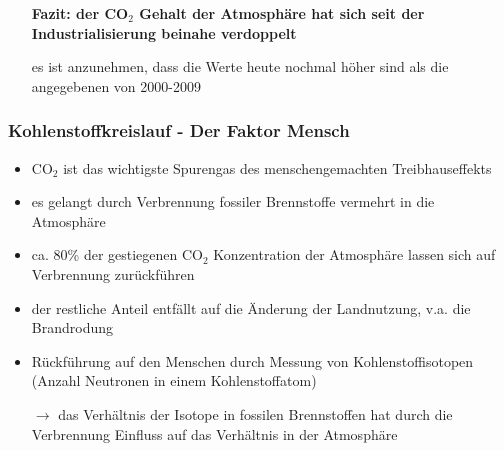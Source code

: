 \begin{frame}
{\begin{itemize}
			\item[] \textbf{Fazit: der CO$_2$ Gehalt der Atmosphäre hat sich seit der Industrialisierung beinahe verdoppelt}
			\item[] es ist anzunehmen, dass die Werte heute nochmal höher sind als die angegebenen von 2000-2009
		\end{itemize}
	}
\end{frame}

\begin{frame}
	\frametitle{Kohlenstoffkreislauf - Der Faktor Mensch}
	\begin{itemize}
		\item CO$_2$ ist das wichtigste Spurengas des menschengemachten Treibhauseffekts
		\item es gelangt durch Verbrennung fossiler Brennstoffe vermehrt in die Atmosphäre
		\item ca. 80\% der gestiegenen CO$_2$ Konzentration der Atmosphäre lassen sich auf Verbrennung zurückführen
		\item der restliche Anteil entfällt auf die Änderung der Landnutzung, v.a. die Brandrodung
		\item Rückführung auf den Menschen durch Messung von Kohlenstoffisotopen (Anzahl Neutronen in einem Kohlenstoffatom)
		\item[$\rightarrow$] das Verhältnis der Isotope in fossilen Brennstoffen hat durch die Verbrennung Einfluss auf das Verhältnis in der Atmosphäre
	\end{itemize}

\end{frame}



